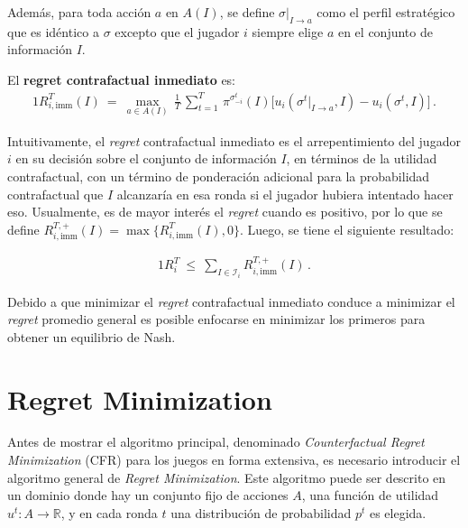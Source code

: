 Además, para toda acción $a$ en $A(I)$, se define $\sigma|_{I \rightarrow a}$ como el perfil estratégico que es idéntico a $\sigma$ excepto que el jugador $i$ siempre elige $a$ en el conjunto de información $I$.

\begin{definition}
\label{def:regret-inmediato}
El \textbf{regret contrafactual inmediato} es:
\begin{alignat}{1}
R_{i, \text{imm}}^T(I)\ =\  \max_{a \in A(I)} \, \frac{1}{T} \, \sum_{t = 1}^T \, \pi^{\sigma_{-i}^t}(I) \biggl[ u_i(\sigma^t|_{I \rightarrow a}, I) - u_i(\sigma^t, I) \biggr]\,.
\end{alignat}
\end{definition}

Intuitivamente, el \textit{regret} contrafactual inmediato es el arrepentimiento del jugador $i$ en su decisión sobre el conjunto de información $I$, en términos de la utilidad contrafactual, con un término de ponderación adicional para la probabilidad contrafactual que $I$ alcanzaría en esa ronda si el jugador hubiera intentado hacer eso. Usualmente, es de mayor interés el \textit{regret} cuando es positivo, por lo que se define $R_{i, \text{imm}}^{T, +} (I) = \max\{R^T_{i, \text{imm}} (I), 0\}$. Luego, se tiene el siguiente resultado:

\begin{theorem}
\begin{alignat}{1}
R_i^T\ \leq\ \sum_{I \in \mathcal{I}_i} R_{i, \text{imm}}^{T, +}(I) \,.
\end{alignat}
\end{theorem}

Debido a que minimizar el \textit{regret} contrafactual inmediato conduce a minimizar el \textit{regret} promedio general es posible enfocarse en minimizar los primeros para obtener un equilibrio de Nash.

\section{Regret Minimization}

Antes de mostrar el algoritmo principal, denominado \textit{Counterfactual Regret Minimization} (CFR) para los juegos en forma extensiva, es necesario introducir el algoritmo general de \textit{Regret Minimization}. Este algoritmo puede ser descrito en un dominio donde hay un conjunto fijo de acciones $A$, una función de utilidad $u^t : A \rightarrow \mathbb{R}$, y en cada ronda $t$ una distribución de probabilidad $p^t$ es elegida.

